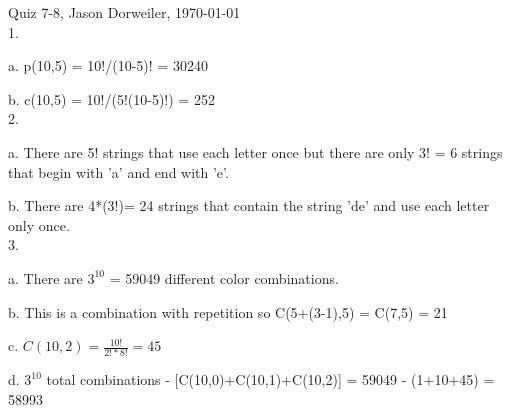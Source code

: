 \documentclass[10pt,a4paper]{report}
\begin{document}
Quiz 7-8, Jason Dorweiler, \today\\

1.

a. p(10,5) = 10!/(10-5)! = 30240


b. c(10,5) = 10!/(5!(10-5)!) = 252\\

2.

a. There are 5! strings that use each letter once but there are only 3! = 6 strings that begin with 'a' and end with 'e'.

b. There are 4*(3!)= 24 strings that contain the string 'de' and use each letter only once.\\

3.

a. There are $3^{10}$ = 59049 different color combinations. 

b. This is a combination with repetition so C(5+(3-1),5) = C(7,5) = 21

c. $C(10,2) = \frac{10!}{2!*8!} = 45$

d. $3^{10}$ total combinations - [C(10,0)+C(10,1)+C(10,2)] = 59049 - (1+10+45) = 58993
\end{document}
